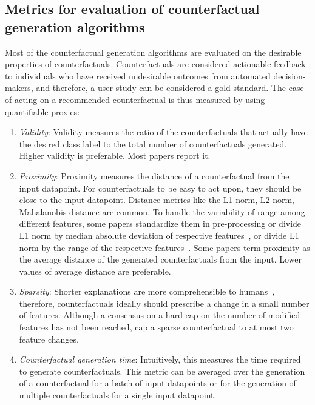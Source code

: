 \subsection{Metrics for evaluation of counterfactual generation algorithms} 

Most of the counterfactual generation algorithms are evaluated on the desirable properties of counterfactuals.  
Counterfactuals are considered actionable feedback to individuals who have received undesirable outcomes from automated decision-makers, and therefore, a user study can be considered a gold standard. 
The ease of acting on a recommended counterfactual is thus measured by using quantifiable proxies:
\begin{enumerate}[leftmargin=*]
    \item \emph{Validity}: Validity measures the ratio of the counterfactuals that actually have the desired class label to the total number of counterfactuals generated. 
    Higher validity is preferable. Most papers report it. 
    
    \item \emph{Proximity}: Proximity measures the distance of a counterfactual from the input datapoint. 
    For counterfactuals to be easy to act upon, they should be close to the input datapoint. Distance metrics like the L1 norm, L2 norm, Mahalanobis distance are common. 
    To handle the variability of range among different features, some papers standardize them in pre-processing or divide L1 norm by median absolute deviation of respective features~\citep{wachter_counterfactual_2017,mothilal_explaining_2020,russell_efficient_2019}, or divide L1 norm by the range of the respective features~\citep{karimi_algorithmic_2020,karimi_model-agnostic_2020,dandl_multi-objective_2020}. 
    Some papers term proximity as the average distance of the generated counterfactuals from the input. Lower values of average distance are preferable. 
    
    \item \emph{Sparsity}: Shorter explanations are more comprehensible to humans~\citep{Miller-xai:2019}, therefore, counterfactuals ideally should prescribe a change in a small number of features. Although a consensus on a hard cap on the number of modified features has not been reached, \citet{keane2020good} cap a sparse counterfactual to at most two feature changes. 
    
    \item \emph{Counterfactual generation time}: Intuitively, this measures the time required to generate counterfactuals. This metric can be averaged over the generation of a counterfactual for a batch of input datapoints or for the generation of multiple counterfactuals for a single input datapoint. 
    

\end{enumerate}
